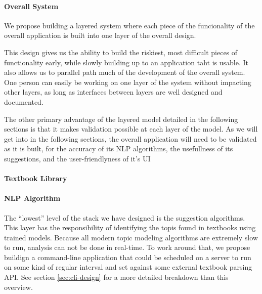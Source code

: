 \paragraph{Overall System}
We propose building a layered system where each piece of the
funcionality of the overall application is built into one layer of the
overall design.

This design gives us the ability to build the riskiest, most difficult
pieces of functionality early, while slowly building up to an
application taht is usable.
It also allows us to parallel path much of the development of the
overall system.
One person can easily be working on one layer of the system without
impacting other layers, as long as interfaces between layers are well
designed and documented.

The other primary advantage of the layered model detailed in the
following sections is that it makes validation possible at each layer
of the model.
As we will get into in the following sections, the overall application
will need to be validated as it is built, for the accuracy of its NLP
algorithms, the usefullness of its suggestions, and the
user-friendlyness of it's UI


\paragraph{Textbook Library}

\paragraph{NLP Algorithm}
The ``lowest'' level of the stack we have designed is the suggestion
algorithms.
This layer has the responsibility of identifying the topis found in
textbooks using trained models.
Because all modern topic modeling algorithms are extremely slow to
run, analysis can not be done in real-time.
To work around that, we propose buildign a command-line application
that could be scheduled on a server to run on some kind of regular
interval and set against some external textbook parsing API.  
See section \ref{sec:cli-design} for a more detailed breakdown than
this overview.

